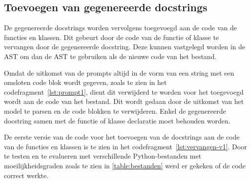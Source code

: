 \subsection{Toevoegen van gegenereerde docstrings}
\label{sec:bestanddocumentatie-vervangen}
De gegenereerde docstrings worden vervolgens toegevoegd aan de code van de functies en klassen.
Dit gebeurt door de code van de functie of klasse te vervangen door de gegenereerde docstring.
Deze kunnen vastgelegd worden in de AST om dan de AST te gebruiken als de nieuwe code van het bestand.

Omdat de uitkomst van de prompts altijd in de vorm van een string met een omsloten code blok wordt gegeven, zoals te zien in het codefragment~\ref{lst:prompt1}, dient dit verwijderd te worden voor het toegevoegd wordt aan de code van het bestand. 
Dit wordt gedaan door de uitkomst van het model te parsen en de code blokken te verwijderen.
Enkel de gegenereerde docstring samen met de functie of klasse declaratie moet behouden worden.

De eerste versie van de code voor het toevoegen van de docstrings aan de code van de functies en klassen is te zien in het codefragment~\ref{lst:vervangen-v1}.
Door te testen en te evalueren met verschillende Python-bestanden met moeilijkheidsgraden zoals te zien in \ref{table:bestanden} werd er gekeken of de code correct werkte.

\begin{table}[h!]
    \centering
    \caption{Aantal functies en klassen in de verschillende Python-bestanden.}
    \label{table:bestanden}
\end{table}

